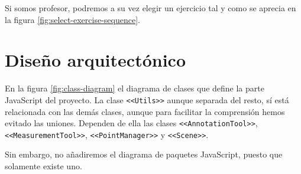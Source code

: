 Si somos profesor, podremos a su vez elegir un ejercicio tal y como se aprecia en la figura \ref{fig:select-exercise-sequence}.

\section{Diseño arquitectónico}\label{sec:diseño-arquitectonico}
En la figura \ref{fig:class-diagram} el diagrama de clases que define la parte JavaScript del proyecto. La clase \texttt{<<Utils>>} aunque separada del resto, sí está relacionada con las demás clases, aunque para facilitar la comprensión hemos evitado las uniones. Dependen de ella las clases \texttt{<<AnnotationTool>>}, \texttt{<<MeasurementTool>>}, \texttt{<<PointManager>>} y \texttt{<<Scene>>}.

Sin embargo, no añadiremos el diagrama de paquetes JavaScript, puesto que solamente existe uno.


